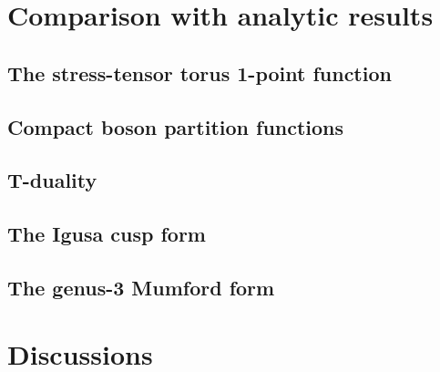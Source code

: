 \documentclass[12pt]{article}
\numberwithin{equation}{section}
\begin{document}
\section{Comparison with analytic results}

\subsection{The stress-tensor torus 1-point function}

\subsection{Compact boson partition functions}

\subsection{T-duality}

\subsection{The Igusa cusp form}

\subsection{The genus-3 Mumford form}

\section{Discussions}

\printbibliography
\end{document}
